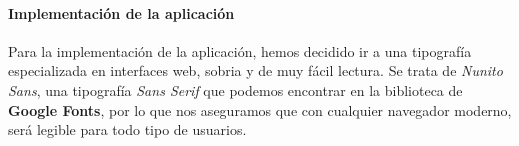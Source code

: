\documentclass[../ei103948-project-documentation.tex]{subfiles}
\begin{document}
\begin{itemize}
\begin{itemize}
\begin{figure}[H]
                                                \begin{center}
                                                \end{center}
                                            \end{figure}
                                        \end{itemize}
                                \end{itemize}

                                \paragraph*{Implementación de la aplicación}
                                Para la implementación de la aplicación, hemos decidido ir a una tipografía especializada en interfaces web, sobria y de muy fácil lectura. Se trata de \textit{Nunito Sans}, una tipografía \textit{Sans Serif} que podemos encontrar en la biblioteca de \textbf{Google Fonts}, por lo que nos aseguramos que con cualquier navegador moderno, será legible para todo tipo de usuarios.\\
                        
\end{document}
